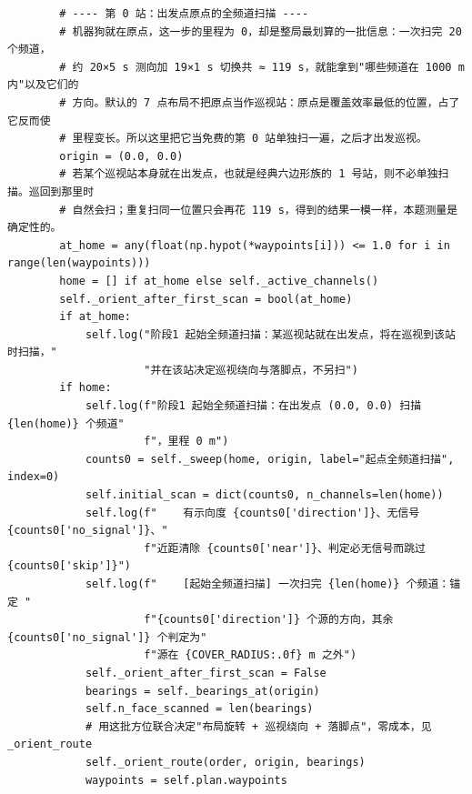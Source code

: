 \documentclass[UTF8, zihao=5,AutoFakeBold=2]{ctexart}
\begin{document}
\begin{lstlisting}
        # ---- 第 0 站：出发点原点的全频道扫描 ----
        # 机器狗就在原点，这一步的里程为 0，却是整局最划算的一批信息：一次扫完 20 个频道，
        # 约 20×5 s 测向加 19×1 s 切换共 ≈ 119 s，就能拿到"哪些频道在 1000 m 内"以及它们的
        # 方向。默认的 7 点布局不把原点当作巡视站：原点是覆盖效率最低的位置，占了它反而使
        # 里程变长。所以这里把它当免费的第 0 站单独扫一遍，之后才出发巡视。
        origin = (0.0, 0.0)
        # 若某个巡视站本身就在出发点，也就是经典六边形族的 1 号站，则不必单独扫描。巡回到那里时
        # 自然会扫；重复扫同一位置只会再花 119 s，得到的结果一模一样，本题测量是确定性的。
        at_home = any(float(np.hypot(*waypoints[i])) <= 1.0 for i in range(len(waypoints)))
        home = [] if at_home else self._active_channels()
        self._orient_after_first_scan = bool(at_home)
        if at_home:
            self.log("阶段1 起始全频道扫描：某巡视站就在出发点，将在巡视到该站时扫描，"
                     "并在该站决定巡视绕向与落脚点，不另扫")
        if home:
            self.log(f"阶段1 起始全频道扫描：在出发点 (0.0, 0.0) 扫描 {len(home)} 个频道"
                     f"，里程 0 m")
            counts0 = self._sweep(home, origin, label="起点全频道扫描", index=0)
            self.initial_scan = dict(counts0, n_channels=len(home))
            self.log(f"    有示向度 {counts0['direction']}、无信号 {counts0['no_signal']}、"
                     f"近距清除 {counts0['near']}、判定必无信号而跳过 {counts0['skip']}")
            self.log(f"    [起始全频道扫描] 一次扫完 {len(home)} 个频道：锚定 "
                     f"{counts0['direction']} 个源的方向，其余 {counts0['no_signal']} 个判定为"
                     f"源在 {COVER_RADIUS:.0f} m 之外")
            self._orient_after_first_scan = False
            bearings = self._bearings_at(origin)
            self.n_face_scanned = len(bearings)
            # 用这批方位联合决定"布局旋转 + 巡视绕向 + 落脚点"，零成本，见 _orient_route
            self._orient_route(order, origin, bearings)
            waypoints = self.plan.waypoints


\end{lstlisting}
\end{document}
